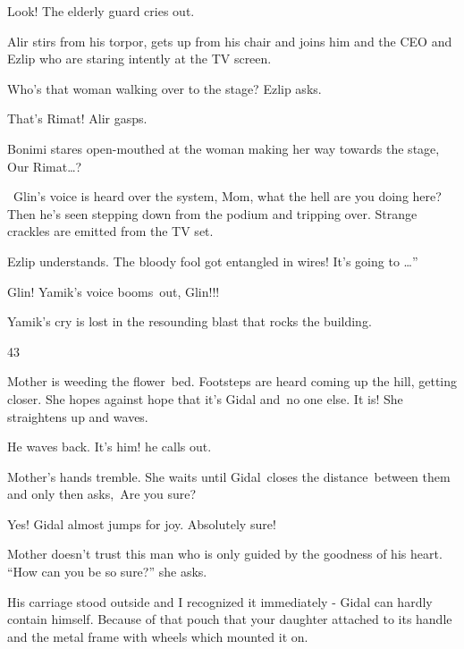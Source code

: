 \documentclass[letterpaper]{article}
\begin{document}
{\textquotedbl}Look!{\textquotedbl} The elderly guard cries out.

Alir stirs from his torpor, gets up from his chair and joins him and the CEO and Ezlip who are staring intently at the
TV screen. 

{\textquotedbl}Who's that woman walking over to the stage?{\textquotedbl} Ezlip asks. 

{\textquotedbl}That's Rimat!{\textquotedbl} Alir gasps. 

Bonimi stares open-mouthed at the woman making her way towards the stage, {\textquotedbl}Our
Rimat{\dots}?{\textquotedbl}

~Glin's voice is heard over the system, {\textquotedbl}Mom, what the hell are you doing here?{\textquotedbl} Then
he\textcolor[rgb]{0.0,0.4392157,0.7529412}{{}'}s seen stepping down from the podium and tripping over. Strange crackles
are emitted from the TV set.

Ezlip understands. {\textquotedbl}The bloody fool got entangled in wires! It's going to {\dots}''

{\textquotedbl}Glin!{\textquotedbl} Yamik's voice booms\textcolor[rgb]{0.0,0.4392157,0.7529412}{\ }out,
{\textquotedbl}Glin!!!{\textquotedbl}

Yamik's cry is lost in the resounding blast that rocks the building.


\bigskip

43\ 

Mother is weeding the flower\ bed. Footsteps are heard coming up the hill, getting closer. She hopes against hope that
it's Gidal and\textcolor[rgb]{0.0,0.4392157,0.7529412}{\ }no one else. It is! She straightens up and waves. 

He waves back. {\textquotedbl}It's him!{\textquotedbl} he calls out. 

Mother's hands tremble. She waits until Gidal~closes the distance~between them and only then
asks,\textcolor[rgb]{0.0,0.4392157,0.7529412}{\ }{\textquotedbl}Are you sure?{\textquotedbl} 

{\textquotedbl}Yes!{\textquotedbl} Gidal almost jumps for joy. {\textquotedbl}Absolutely sure!{\textquotedbl} 

Mother doesn't trust this man who is only guided by the goodness of his heart. ``How can you be so sure?'' she asks.

{\textquotedbl}His carriage stood outside and I recognized it immediately -{\textquotedbl} Gidal can hardly contain
himself. {\textquotedbl}Because of that pouch that your daughter attached to its handle and the metal frame with wheels
which mounted it on.{\textquotedbl}
\end{document}
